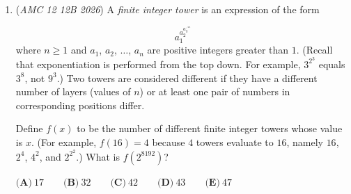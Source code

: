 \begin{enumerate}
	\item (\textit{AMC 12 12B 2026}) A \textit{finite integer tower} is an expression of the form

 \[a_{1}^{a_{2}^{a_{3}^{\iddots^{a_{n}}}}}\]
where $n \geq 1$ and $a_{1}$, $a_2$, $\dots$, $a_{n}$ are positive integers greater than $1$. (Recall that exponentiation is performed from the top down. For example, $3^{2^{3}}$ equals $3^{8}$, not $9^{3}$.) Two towers are considered different if they have a different number of layers (values of $n$) or at least one pair of numbers in corresponding positions differ.


 Define $f(x)$ to be the number of different finite integer towers whose value is $x$. (For example, $f(16)=4$ because $4$ towers evaluate to $16$, namely $16$, $2^{4}$, $4^2$, and $2^{2^{2}}$.) What is $f(2^{8192})$?


 $\textbf{(A)}\   17  \qquad                 \textbf{(B)}\   32  \qquad                 \textbf{(C)}\   42  \qquad                 \textbf{(D)}\   43  \qquad                 \textbf{(E)}\   47$


\end{enumerate}